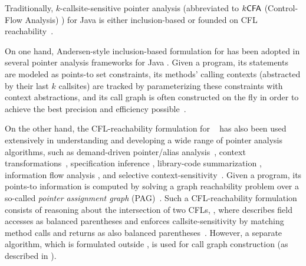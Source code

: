 Traditionally, $k$-callsite-sensitive pointer analysis (abbreviated to
 $\textsf{$k$CFA}$ (Control-Flow Analysis) \cite{shivers1991control}) for Java
is either inclusion-based \cite{andersen1994program} or  founded on CFL reachability~\cite{reps1998program}. 

On one hand, Andersen-style 
inclusion-based formulation for    \cite{kastrinis2013hybrid, thiessen2017context} has been adopted in several pointer analysis frameworks for Java
\cite{naik2006effective,vallee2010soot,WALA2022,bravenboer2009strictly, he_et_al:LIPIcs.ECOOP.2022.30}. 
 Given a  program, its statements are modeled as  points-to set constraints,  its methods' calling contexts (abstracted by their
 last $k$
 callsites)  are tracked by parameterizing these constraints with context abstractions, and its call graph 
 is often constructed on the fly in order to achieve  the best precision and efficiency possible~\cite{grove2001framework, ryder2003dimensions, lhotak2003scaling, lhotak2008evaluating, smaragdakis2011pick}.

On the other hand, the
CFL-reachability formulation for ~\cite{sridharan2006refinement} has also been used extensively in  understanding and developing  a wide range of pointer analysis algorithms, such as demand-driven pointer/alias analysis~\cite{sridharan2005demand, sridharan2006refinement, zheng2008demand, yan2011demand, shang2012demand}, context transformations~\cite{thiessen2017context}, 
specification inference \cite{Bastani15PLDI},
library-code summarization \cite{shang2012demand, tang2015summary},
  information flow analysis \cite{li2020fast,milanova2020flowcfl},
and selective context-sensitivity~\cite{lu2021selective,li2018precision}. 
Given a program,  its points-to information is computed by solving a graph reachability problem over
 a so-called \textit{pointer assignment graph} (PAG)~\cite{lhotak2003scaling}. 
Such a CFL-reachability formulation consists of reasoning about the intersection of two CFLs, \manuCapLFC, 
where \manuLF describes field accesses as balanced parentheses and \manuLC enforces 
  callsite-sensitivity by matching method calls and returns as also balanced parentheses~\cite{sridharan2006refinement}. However,
 a separate algorithm, which is formulated outside \manuLFC, is used for call graph construction (as
 described in ).

